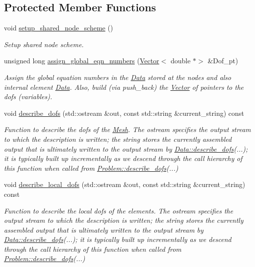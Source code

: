 \subsection*{Protected Member Functions}
\begin{DoxyCompactItemize}
\item 
void \hyperlink{classoomph_1_1Mesh_a1ef2de4e0406dd4ed6317cf857b2c3b1}{setup\+\_\+shared\+\_\+node\+\_\+scheme} ()
\begin{DoxyCompactList}\small\item\em Setup shared node scheme. \end{DoxyCompactList}\item 
unsigned long \hyperlink{classoomph_1_1Mesh_a6c24ccddd928dba0476443f7a74c9d6f}{assign\+\_\+global\+\_\+eqn\+\_\+numbers} (\hyperlink{classoomph_1_1Vector}{Vector}$<$ double $\ast$$>$ \&Dof\+\_\+pt)
\begin{DoxyCompactList}\small\item\em Assign the global equation numbers in the \hyperlink{classoomph_1_1Data}{Data} stored at the nodes and also internal element \hyperlink{classoomph_1_1Data}{Data}. Also, build (via push\+\_\+back) the \hyperlink{classoomph_1_1Vector}{Vector} of pointers to the dofs (variables). \end{DoxyCompactList}\item 
void \hyperlink{classoomph_1_1Mesh_a86d000c45f6d29fa215b98051cc2d23f}{describe\+\_\+dofs} (std\+::ostream \&out, const std\+::string \&current\+\_\+string) const
\begin{DoxyCompactList}\small\item\em Function to describe the dofs of the \hyperlink{classoomph_1_1Mesh}{Mesh}. The ostream specifies the output stream to which the description is written; the string stores the currently assembled output that is ultimately written to the output stream by \hyperlink{classoomph_1_1Data_a2dae16e2dcff9a40029f834c83364df5}{Data\+::describe\+\_\+dofs}(...); it is typically built up incrementally as we descend through the call hierarchy of this function when called from \hyperlink{classoomph_1_1Problem_abc103804eb319ae0b3d43870cc3e1eaf}{Problem\+::describe\+\_\+dofs}(...) \end{DoxyCompactList}\item 
void \hyperlink{classoomph_1_1Mesh_a57d57b7b6d7a32fadafb03e7055c5ad4}{describe\+\_\+local\+\_\+dofs} (std\+::ostream \&out, const std\+::string \&current\+\_\+string) const
\begin{DoxyCompactList}\small\item\em Function to describe the local dofs of the elements. The ostream specifies the output stream to which the description is written; the string stores the currently assembled output that is ultimately written to the output stream by \hyperlink{classoomph_1_1Data_a2dae16e2dcff9a40029f834c83364df5}{Data\+::describe\+\_\+dofs}(...); it is typically built up incrementally as we descend through the call hierarchy of this function when called from \hyperlink{classoomph_1_1Problem_abc103804eb319ae0b3d43870cc3e1eaf}{Problem\+::describe\+\_\+dofs}(...) \end{DoxyCompactList}\item 
$$
\end{DoxyCompactItemize}
